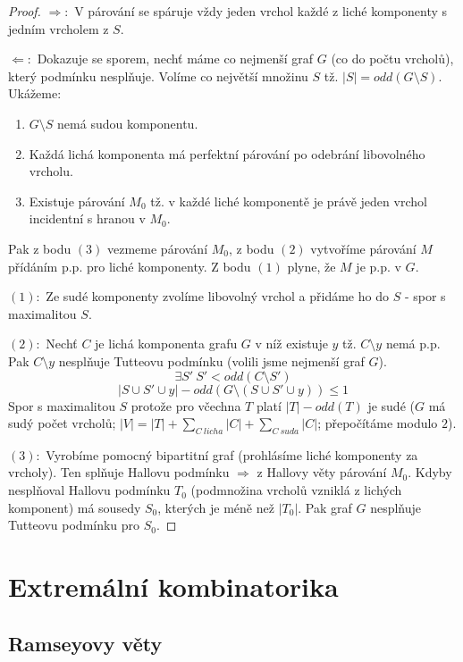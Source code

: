 \documentclass[a4paper,10pt,titlepage]{article} \usepackage[utf8]{inputenc}
\begin{document}
\begin{proof}
$\Rightarrow :$ V párování se spáruje vždy jeden vrchol každé z liché komponenty s jedním vrcholem z $S$.

$\Leftarrow :$ Dokazuje se sporem, nechť máme co nejmenší graf $G$ (co do počtu vrcholů), který podmínku nesplňuje.
Volíme co největší množinu $S$ tž. $|S| = odd(G\setminus S)$. Ukážeme:
\begin{enumerate}
\item $G\setminus S$ nemá sudou komponentu.
\item Každá lichá komponenta má perfektní párování po odebrání libovolného vrcholu.
\item Existuje párování $M_0$ tž. v každé liché komponentě je právě jeden vrchol incidentní s hranou v $M_0$.
\end{enumerate}

Pak z bodu $(3)$ vezmeme párování $M_0$, z bodu $(2)$ vytvoříme párování $M$ přídáním p.p. pro liché komponenty.
Z bodu $(1)$ plyne, že $M$ je p.p. v $G$.

$(1):$ Ze sudé komponenty zvolíme libovolný vrchol a přidáme ho do $S$ - spor s maximalitou $S$.

$(2):$ Nechť $C$ je lichá komponenta grafu $G$ v níž existuje $y$ tž. $C\setminus y$  nemá p.p.
Pak $C\setminus y$ nesplňuje Tutteovu podmínku (volili jsme nejmenší graf $G$).
\[
	\exists S'\ S' < odd(C\setminus S')
\]
\[
	|S\cup S' \cup y| - odd(G \setminus (S\cup S' \cup y)) \leq 1
\]
Spor s maximalitou $S$ protože pro včechna $T$ platí $|T| - odd(T)$ je sudé
($G$ má sudý počet vrcholů; $|V|=|T|+\sum_{C\ licha} |C| +\sum_{C\ suda} |C|$; přepočítáme modulo $2$).

$(3):$ Vyrobíme pomocný bipartitní graf (prohlásíme liché komponenty za vrcholy).
Ten splňuje Hallovu podmínku $\Rightarrow$ z Hallovy věty párování $M_0$.
Kdyby nesplňoval Hallovu podmínku $T_0$ (podmnožina vrcholů vzniklá z lichých komponent)
má sousedy $S_0$, kterých je méně než $|T_0|$. Pak graf $G$ nesplňuje Tutteovu podmínku pro $S_0$.
\end{proof}

\section{Extremální kombinatorika}

\subsection{Ramseyovy věty}
\end{document}
